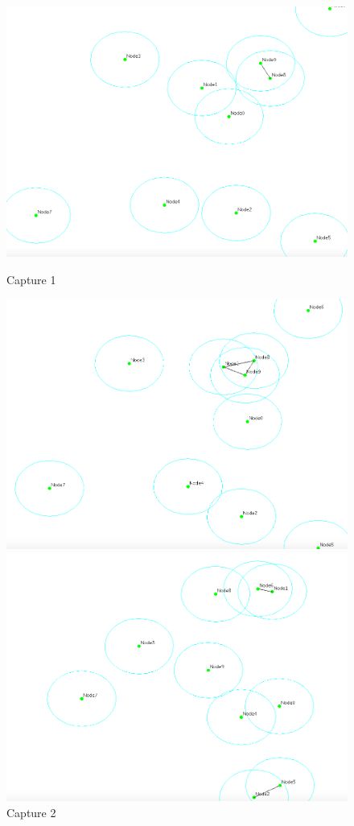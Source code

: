 \documentclass[10pt]{report}
\begin{document}
\begin{figure}[H]
\centering
\begin{minipage}{0.3\textwidth} \begin{flushleft}
\includegraphics[height = 0.2\textheight,width = .8\textwidth]{imgs/2.png}
 		\caption[cap1]{Capture 1}
        \label{fig:Capture 1}
\end{flushleft}\end{minipage}
\begin{minipage}{0.3\textwidth} \begin{center}
\includegraphics[height = 0.2\textheight,width = .8\textwidth]{imgs/3.png}
 		\caption[cap2]{Capture 2}
        \label{fig:Capture 2}
\end{center}\end{minipage}
\begin{minipage}{0.3\textwidth} \begin{flushright}
\includegraphics[height = 0.2\textheight,width = .8\textwidth]{imgs/4.png}

\end{flushright}
\end{minipage}
\end{figure}
\end{document}
